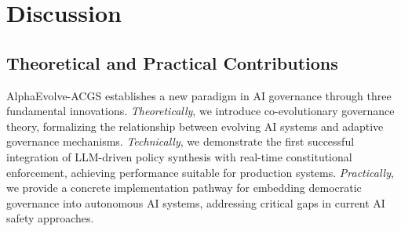 \documentclass[sigconf,natbib]{acmart}
\begin{document}
\section{Discussion}
\label{sec:discussion}

\subsection{Theoretical and Practical Contributions}
AlphaEvolve-ACGS establishes a new paradigm in AI governance through three fundamental innovations. \textit{Theoretically}, we introduce co-evolutionary governance theory, formalizing the relationship between evolving AI systems and adaptive governance mechanisms. \textit{Technically}, we demonstrate the first successful integration of LLM-driven policy synthesis with real-time constitutional enforcement, achieving performance suitable for production systems. \textit{Practically}, we provide a concrete implementation pathway for embedding democratic governance into autonomous AI systems, addressing critical gaps in current AI safety approaches.
\end{document}
